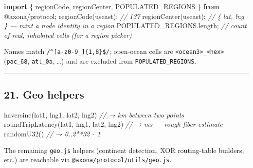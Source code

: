 \documentclass[
  nobib]{tufte-handout}
\newenvironment{Shaded}{}{}
\newcommand{\AttributeTok}[1]{\textcolor[rgb]{0.49,0.56,0.16}{#1}}
\newcommand{\CommentTok}[1]{\textcolor[rgb]{0.38,0.63,0.69}{\textit{#1}}}
\newcommand{\FunctionTok}[1]{\textcolor[rgb]{0.02,0.16,0.49}{#1}}
\newcommand{\ImportTok}[1]{\textcolor[rgb]{0.00,0.50,0.00}{\textbf{#1}}}
\newcommand{\NormalTok}[1]{#1}
\newcommand{\OperatorTok}[1]{\textcolor[rgb]{0.40,0.40,0.40}{#1}}
\newcommand{\StringTok}[1]{\textcolor[rgb]{0.25,0.44,0.63}{#1}}
\begin{document}
\begin{Shaded}
\begin{Highlighting}[]
\ImportTok{import}\NormalTok{ \{ regionCode}\OperatorTok{,}\NormalTok{ regionCenter}\OperatorTok{,}\NormalTok{ POPULATED\_REGIONS \} }\ImportTok{from} \StringTok{\textquotesingle{}@axona/protocol\textquotesingle{}}\OperatorTok{;}
\FunctionTok{regionCode}\NormalTok{(}\StringTok{\textquotesingle{}useast\textquotesingle{}}\NormalTok{)}\OperatorTok{;}         \CommentTok{// 137}
\FunctionTok{regionCenter}\NormalTok{(}\StringTok{\textquotesingle{}useast\textquotesingle{}}\NormalTok{)}\OperatorTok{;}       \CommentTok{// \{ lat, lng \} — mint a node identity in a region}
\NormalTok{POPULATED\_REGIONS}\OperatorTok{.}\AttributeTok{length}\OperatorTok{;}     \CommentTok{// count of real, inhabited cells (for a region picker)}
\end{Highlighting}
\end{Shaded}

Names match \texttt{/\^{}{[}a-z0-9\_{]}\{1,8\}\$/}; open-ocean cells are
\texttt{\textless{}ocean3\textgreater{}\_\textless{}hex\textgreater{}}
(\texttt{pac\_68}, \texttt{atl\_0a}, \ldots) and are excluded from
\texttt{POPULATED\_REGIONS}.

\begin{center}\rule{0.5\linewidth}{0.5pt}\end{center}

\subsection{21. Geo helpers}\label{geo-helpers}

\begin{Shaded}
\begin{Highlighting}[]
\FunctionTok{haversine}\NormalTok{(lat1}\OperatorTok{,}\NormalTok{ lng1}\OperatorTok{,}\NormalTok{ lat2}\OperatorTok{,}\NormalTok{ lng2)        }\CommentTok{// → km between two points}
\FunctionTok{roundTripLatency}\NormalTok{(lat1}\OperatorTok{,}\NormalTok{ lng1}\OperatorTok{,}\NormalTok{ lat2}\OperatorTok{,}\NormalTok{ lng2) }\CommentTok{// → ms — rough fiber estimate}
\FunctionTok{randomU32}\NormalTok{()                               }\CommentTok{// → 0..2**32 {-} 1}
\end{Highlighting}
\end{Shaded}

The remaining \texttt{geo.js} helpers (continent detection, XOR
routing-table builders, etc.) are reachable via
\texttt{@axona/protocol/utils/geo.js}.
\end{document}
